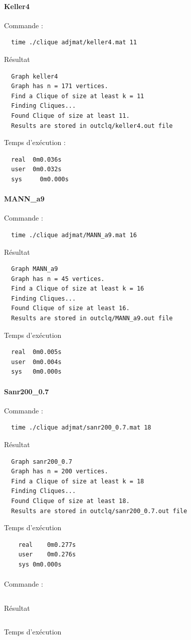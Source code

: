 \documentclass{article}
\begin{document}
\paragraph{Keller4}
Commande :
\begin{verbatim}
  time ./clique adjmat/keller4.mat 11
\end{verbatim}
Résultat
\begin{verbatim}
  Graph keller4
  Graph has n = 171 vertices.
  Find a Clique of size at least k = 11
  Finding Cliques...
  Found Clique of size at least 11.
  Results are stored in outclq/keller4.out file
\end{verbatim}
Temps d'exécution :
\begin{verbatim}
  real	0m0.036s
  user	0m0.032s
  sys	  0m0.000s
\end{verbatim}
\paragraph{MANN\_a9}
Commande :
\begin{verbatim}
  time ./clique adjmat/MANN_a9.mat 16
\end{verbatim}
Résultat
\begin{verbatim}
  Graph MANN_a9
  Graph has n = 45 vertices.
  Find a Clique of size at least k = 16
  Finding Cliques...
  Found Clique of size at least 16.
  Results are stored in outclq/MANN_a9.out file
\end{verbatim}
Temps d'exécution
\begin{verbatim}
  real	0m0.005s
  user	0m0.004s
  sys	0m0.000s
\end{verbatim}
\paragraph{Sanr200\_0.7}
Commande :
\begin{verbatim}
  time ./clique adjmat/sanr200_0.7.mat 18
\end{verbatim}
Résultat
\begin{verbatim}
  Graph sanr200_0.7
  Graph has n = 200 vertices.
  Find a Clique of size at least k = 18
  Finding Cliques...
  Found Clique of size at least 18.
  Results are stored in outclq/sanr200_0.7.out file
\end{verbatim}
Temps d'exécution
\begin{verbatim}
    real	0m0.277s
    user	0m0.276s
    sys	0m0.000s
\end{verbatim}
\paragraph{}
Commande :
\begin{verbatim}
\end{verbatim}
Résultat
 \begin{verbatim}
\end{verbatim}
Temps d'exécution
\begin{verbatim}
\end{verbatim}
\end{document}
